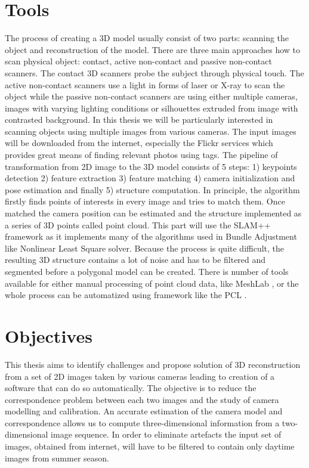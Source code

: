 \section{Tools}
\label{sec:tools}
The process of creating a 3D model usually consist of two parts: scanning the object and reconstruction of the model. There are three main approaches how to scan physical object: contact, active non-contact  and passive non-contact scanners. The contact 3D scanners probe the subject through physical touch. The active non-contact scanners use a light in forms of laser or X-ray to scan the object while the passive non-contact scanners are using either multiple cameras, images with varying lighting conditions or silhouettes extruded from image with contrasted background. In this thesis we will be particularly interested in scanning objects using multiple images from various cameras. The input images will be downloaded from the internet, especially the Flickr services which provides great means of finding relevant photos using tags. The pipeline of transformation from 2D image to the 3D model consists of 5 steps: 1) keypoints detection 2) feature extraction  3) feature matching 4) camera initialization and pose estimation and finally 5) structure computation. In principle, the algorithm firstly finds points of interests in every image and tries to match them. Once matched the camera position can be estimated and the structure implemented as a series of 3D points called point cloud. This part will use the SLAM++ framework \cite{www:slam} as it implements many of the algorithms used in Bundle Adjustment like Nonlinear Least Square solver. Because the process is quite difficult, the resulting 3D structure contains a lot of noise and has to be filtered and segmented before a polygonal model can be created. There is number of tools available for either manual processing of point cloud data, like MeshLab \cite{www:meshlab}, or the whole process can be automatized using framework like the PCL \cite{www:pcl}. 

\section{Objectives}
This thesis aims to identify challenges and propose solution of 3D reconstruction from a set of 2D images taken by various cameras leading to creation of a software that can do so automatically. The objective is to reduce the correspondence problem between each two images and the study of camera modelling and calibration. An accurate estimation of the camera model and correspondence allows us to compute three-dimensional information from a two-dimensional image sequence. In order to eliminate artefacts the input set of images, obtained from internet, will have to be filtered to contain only daytime images from summer season.


